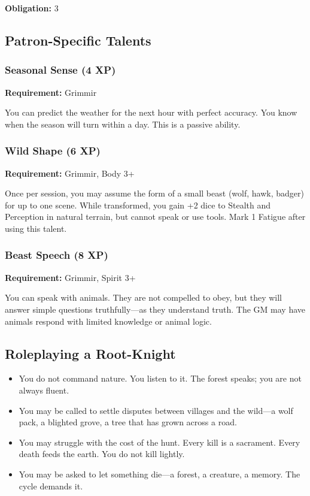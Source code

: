 \textbf{Obligation:} 3

\subsection{Patron-Specific Talents}

\subsubsection{Seasonal Sense (4 XP)}

\textbf{Requirement:} Grimmir

You can predict the weather for the next hour with perfect accuracy. You know when the season will turn within a day. This is a passive ability.

\subsubsection{Wild Shape (6 XP)}

\textbf{Requirement:} Grimmir, Body 3+

Once per session, you may assume the form of a small beast (wolf, hawk, badger) for up to one scene. While transformed, you gain +2 dice to Stealth and Perception in natural terrain, but cannot speak or use tools. Mark 1 Fatigue after using this talent.

\subsubsection{Beast Speech (8 XP)}

\textbf{Requirement:} Grimmir, Spirit 3+

You can speak with animals. They are not compelled to obey, but they will answer simple questions truthfully—as they understand truth. The GM may have animals respond with limited knowledge or animal logic.

\subsection{Roleplaying a Root-Knight}

\begin{itemize}
\item You do not command nature. You listen to it. The forest speaks; you are not always fluent.
\item You may be called to settle disputes between villages and the wild—a wolf pack, a blighted grove, a tree that has grown across a road.
\item You may struggle with the cost of the hunt. Every kill is a sacrament. Every death feeds the earth. You do not kill lightly.
\item You may be asked to let something die—a forest, a creature, a memory. The cycle demands it.
\end{itemize}

